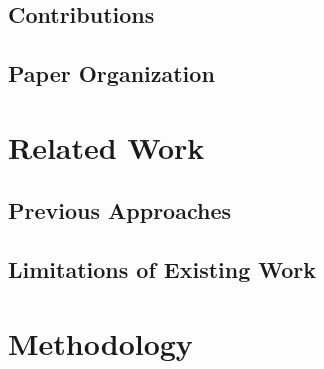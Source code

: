 \documentclass[11pt,a4paper]{article}
\begin{document}

\subsection{Contributions}
\label{subsec:contributions}


\subsection{Paper Organization}
\label{subsec:organization}


\section{Related Work}
\label{sec:related_work}


\subsection{Previous Approaches}
\label{subsec:previous_approaches}


\subsection{Limitations of Existing Work}
\label{subsec:limitations}


\section{Methodology}
\label{sec:methodology}
\end{document}
